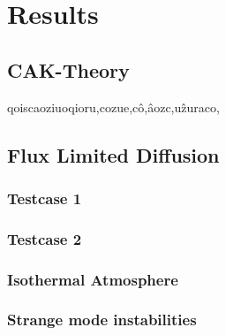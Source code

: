 \chapter{Results}

\section{CAK-Theory}
qoiscaoziuoqioru,cozue,cô,âozc,uẑuraco,

\section{Flux Limited Diffusion}
\subsection{Testcase 1}
\subsection{Testcase 2}
\subsection{Isothermal Atmosphere}
\subsection{Strange mode instabilities}
